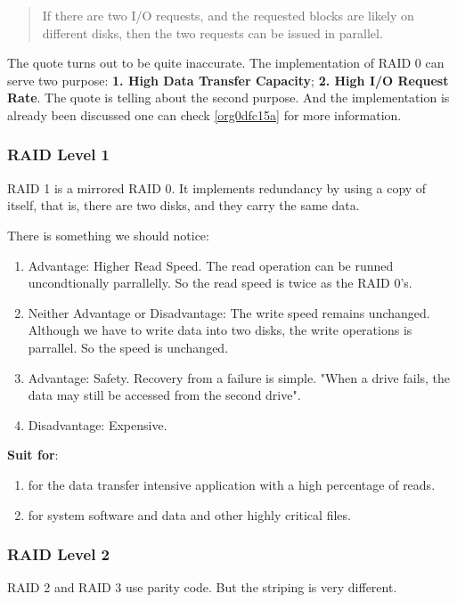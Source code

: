 \documentclass[11pt]{article}
\begin{document}
\begin{quote}
If there are two I/O requests, and the requested blocks are likely on different disks, then the two requests can be issued in parallel.
\end{quote}

The quote turns out to be quite inaccurate. The implementation of RAID 0 can serve two purpose: \textbf{1. High Data Transfer Capacity}; \textbf{2. High I/O Request Rate}. The quote is telling about the second purpose. And the implementation is already been discussed one can check \ref{org0dfc15a}
for more information.

\subsubsection{RAID Level 1}
\label{sec:orgece926b}

RAID 1 is a mirrored RAID 0. It implements redundancy by using a copy of itself, that is, there are two disks, and they carry the same data.

There is something we should notice: 
\begin{enumerate}
\item Advantage: Higher Read Speed. The read operation can be runned uncondtionally parrallelly. So the read speed is twice as the RAID 0's.
\item Neither Advantage or Disadvantage: The write speed remains unchanged. Although we have to write data into two disks, the write operations is parrallel. So the speed is unchanged.
\item Advantage: Safety. Recovery from a failure is simple. "When a drive fails, the data may still be accessed from the second drive".
\item Disadvantage: Expensive.
\end{enumerate}

\textbf{Suit for}: 
\begin{enumerate}
\item for the data transfer intensive application with a high percentage of reads.
\item for system software and data and other highly critical files.
\end{enumerate}

\subsubsection{RAID Level 2}
\label{sec:org5f0775c}

RAID 2 and RAID 3 use parity code. But the striping is very different.
\end{document}
